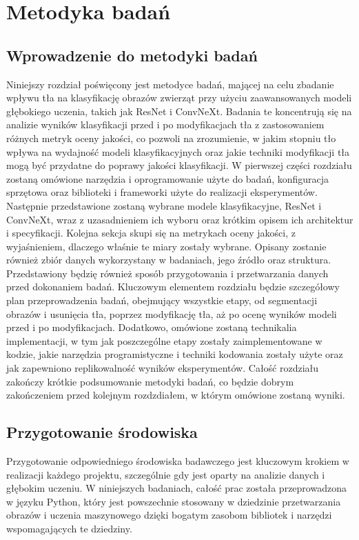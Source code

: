 \chapter*{Metodyka badań}

\section*{Wprowadzenie do metodyki badań}

Niniejszy rozdział poświęcony jest metodyce badań, mającej na celu zbadanie wpływu tła na klasyfikację obrazów zwierząt przy użyciu zaawansowanych modeli głębokiego uczenia, takich jak ResNet i ConvNeXt. 
Badania te koncentrują się na analizie wyników klasyfikacji przed i po modyfikacjach tła z zastosowaniem różnych metryk oceny jakości, co pozwoli na zrozumienie, w jakim stopniu tło wpływa na wydajność modeli klasyfikacyjnych oraz jakie 
techniki modyfikacji tła mogą być przydatne do poprawy jakości klasyfikacji. W pierwszej części rozdziału zostaną omówione narzędzia i oprogramowanie użyte do badań, konfiguracja sprzętowa oraz biblioteki i frameworki użyte do 
realizacji eksperymentów. Następnie przedstawione zostaną wybrane modele klasyfikacyjne, ResNet i ConvNeXt, wraz z uzasadnieniem ich wyboru oraz krótkim opisem ich architektur i specyfikacji. Kolejna sekcja skupi się na metrykach oceny 
jakości, z wyjaśnieniem, dlaczego właśnie te miary zostały wybrane. Opisany zostanie również zbiór danych wykorzystany w badaniach, jego źródło oraz struktura. Przedstawiony będzię również sposób przygotowania i przetwarzania danych przed 
dokonaniem badań. Kluczowym elementem rozdziału będzie szczegółowy plan przeprowadzenia badań, obejmujący wszystkie etapy, od segmentacji obrazów i usunięcia tła, poprzez modyfikację tła, aż po ocenę wyników modeli przed i po modyfikacjach. 
Dodatkowo, omówione zostaną technikalia implementacji, w tym jak poszczególne etapy zostały zaimplementowane w kodzie, jakie narzędzia programistyczne i techniki kodowania zostały użyte oraz jak zapewniono replikowalność wyników eksperymentów. 
Całość rozdziału zakończy krótkie podsumowanie metodyki badań, co będzie dobrym zakończeniem przed kolejnym rozdzdiałem, w którym omówione zostaną wyniki.

\section*{Przygotowanie środowiska}

Przygotowanie odpowiedniego środowiska badawczego jest kluczowym krokiem w realizacji każdego projektu, szczególnie gdy jest oparty na analizie danych i głębokim uczeniu. W niniejszych badaniach, całość prac została przeprowadzona w języku 
Python, który jest powszechnie stosowany w dziedzinie przetwarzania obrazów i uczenia maszynowego dzięki bogatym zasobom bibliotek i narzędzi wspomagających te dziedziny.

